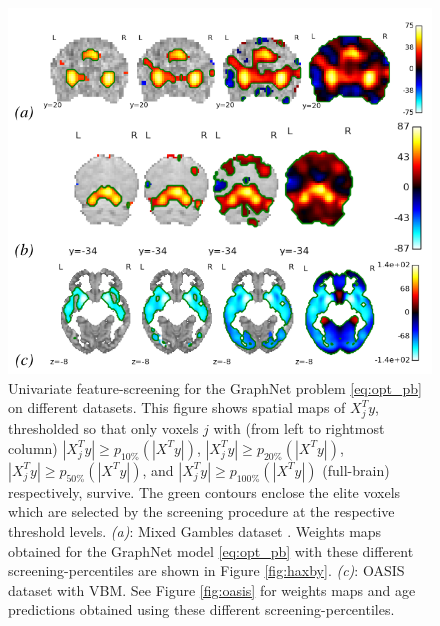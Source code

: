  \begin{figure}[!htb]
   \includegraphics[width=1\linewidth]{figures/screening.png}
\caption{Univariate feature-screening for the
  GraphNet
  problem \eqref{eq:opt_pb} on
  different datasets.
  This figure shows spatial maps of
  $X^T_jy$, thresholded so that only voxels $j$ with (from left to
  rightmost column)  $|X^T_jy| \ge p_{10\%}(|X^Ty|)$, $|X^T_jy| \ge
  p_{20\%}(|X^Ty|)$, $|X^T_jy| \ge p_{50\%}(|X^Ty|)$, and $|X^T_jy|
  \ge p_{100\%}(|X^Ty|)$ (full-brain) respectively, survive. The
  green contours enclose the elite voxels which are selected by the
  screening procedure at the respective threshold
  levels. \textit{(a)}: Mixed Gambles dataset
  \citep{jimura2012}.%
  Weights maps obtained for the GraphNet
  model \eqref{eq:opt_pb} with these different
  screening-percentiles are shown in Figure
  \ref{fig:haxby}. \textit{(c)}: OASIS dataset \citep{marcus2007open}
  with VBM. See Figure \ref{fig:oasis} for weights maps and
  age predictions obtained using these different
  screening-percentiles. %
}

\label{fig:screening}
\end{figure}

